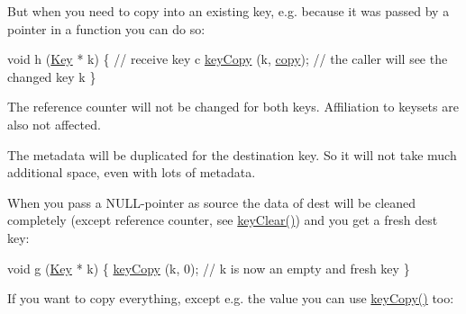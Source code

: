 But when you need to copy into an existing key, e.\+g. because it was passed by a pointer in a function you can do so\+:


\begin{DoxyCodeInclude}
\textcolor{keywordtype}{void} h (\hyperlink{classkdb_1_1Key_a5679f5cae63caddd64a60388b9cc77fa}{Key} * k)
\{
        \textcolor{comment}{// receive key c}
        \hyperlink{group__key_ga6a12cbbe656a1ad9f41b8c681d7a2f92}{keyCopy} (k, \hyperlink{classkdb_1_1Key_ab5bc93e22f4cf40b9d2b1fc32cc260be}{copy});
        \textcolor{comment}{// the caller will see the changed key k}
\}
\end{DoxyCodeInclude}
 The reference counter will not be changed for both keys. Affiliation to keysets are also not affected.

The metadata will be duplicated for the destination key. So it will not take much additional space, even with lots of metadata.

When you pass a N\+U\+L\+L-\/pointer as source the data of dest will be cleaned completely (except reference counter, see \hyperlink{group__key_gab2242311a36bbc0520e0d36895107ec1}{key\+Clear()}) and you get a fresh dest key\+:


\begin{DoxyCodeInclude}
\textcolor{keywordtype}{void} g (\hyperlink{classkdb_1_1Key_a5679f5cae63caddd64a60388b9cc77fa}{Key} * k)
\{
        \hyperlink{group__key_ga6a12cbbe656a1ad9f41b8c681d7a2f92}{keyCopy} (k, 0);
        \textcolor{comment}{// k is now an empty and fresh key}
\}
\end{DoxyCodeInclude}
 If you want to copy everything, except e.\+g. the value you can use \hyperlink{group__key_ga6a12cbbe656a1ad9f41b8c681d7a2f92}{key\+Copy()} too\+:


